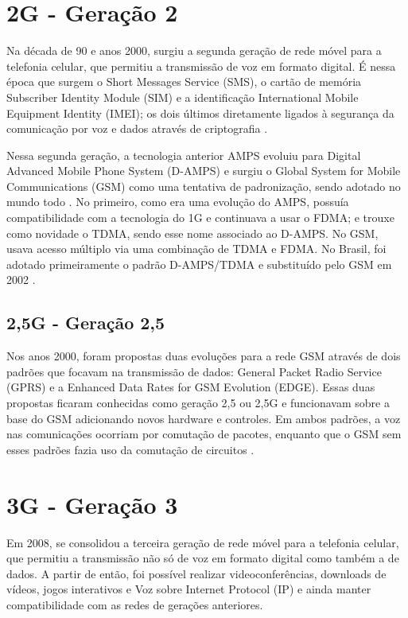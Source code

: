 \documentclass[11pt,oneside,a4paper]{abntex2}
\begin{document}
\section*{2G - Geração 2}
\label{2g}

Na década de 90 e anos 2000, surgiu a segunda geração de rede móvel para a telefonia celular, que permitiu a transmissão de voz em formato digital. É nessa época que surgem o Short Messages Service (SMS), o cartão de memória Subscriber Identity Module (SIM) e a identificação International Mobile Equipment Identity (IMEI); os dois últimos diretamente ligados à segurança da comunicação por voz e dados através de criptografia \cite{tcc2}.

Nessa segunda geração, a tecnologia anterior AMPS evoluiu para Digital Advanced Mobile Phone System (D-AMPS) e surgiu o Global System for Mobile Communications (GSM) como uma tentativa de padronização, sendo adotado no mundo todo \cite{aula3}. No primeiro, como era uma evolução do AMPS, possuía compatibilidade com a tecnologia do 1G e continuava a usar o FDMA; e trouxe como novidade o TDMA, sendo esse nome associado ao D-AMPS. No GSM, usava acesso múltiplo via uma combinação de TDMA e FDMA. No Brasil, foi adotado primeiramente o padrão D-AMPS/TDMA e substituído pelo GSM em 2002 \cite{tcc2}.

\subsection*{2,5G - Geração 2,5}

Nos anos 2000, foram propostas duas evoluções para a rede GSM através de dois padrões que focavam na transmissão de dados: General Packet Radio Service (GPRS) e a Enhanced Data Rates for GSM Evolution (EDGE). Essas duas propostas ficaram conhecidas como geração 2,5 ou 2,5G e funcionavam sobre a base do GSM adicionando novos hardware e controles. Em ambos padrões, a voz nas comunicações ocorriam por comutação de pacotes, enquanto que o GSM sem esses padrões fazia uso da comutação de circuitos \cite{tcc2}.

\section*{3G - Geração 3}
\label{3g}

Em 2008, se consolidou a terceira geração de rede móvel para a telefonia celular, que permitiu a transmissão não só de voz em formato digital como também a de dados. A partir de então, foi possível realizar videoconferências, downloads de vídeos, jogos interativos e Voz sobre Internet Protocol (IP) \cite{tcc1} e ainda manter compatibilidade com as redes de gerações anteriores.
\end{document}
